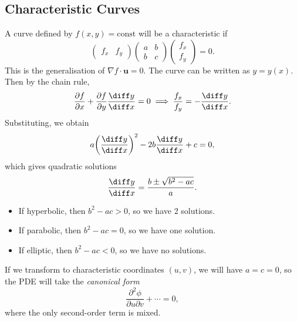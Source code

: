 \documentclass[12pt]{article}
\begin{document}
\subsection{Characteristic Curves}%
\label{sub:characteristic_curves}

A curve defined by $f(x, y) = \text{const}$ will be a characteristic if
\[
\begin{pmatrix}
	f_x & f_y
\end{pmatrix}
\begin{pmatrix}
	a & b \\
	b & c
\end{pmatrix}
\begin{pmatrix}
	f_x \\
	f_y
\end{pmatrix}
= 0
.\]
This is the generalisation of $\nabla f \cdot \mathbf{u} = 0$. The curve can be written as $y = y(x)$. Then by the chain rule,
\[
\frac{\partial f}{\partial x} + \frac{\partial f}{\partial y} \frac{\diff y}{\diff x} = 0 \implies \frac{f_x}{f_y} = - \frac{\diff y}{\diff x}
.\]
Substituting, we obtain
\[
	a \biggl( \frac{\diff y}{\diff x} \biggr)^2 - 2b \frac{\diff y}{\diff x} + c = 0
,\]
which gives quadratic solutions
\[
	\frac{\diff y}{\diff x} = \frac{b \pm \sqrt{b^2 - ac}}{a}
.\]
\begin{itemize}
	\item If hyperbolic, then $b^2 - ac > 0$, so we have 2 solutions.
	\item If parabolic, then $b^2 - ac = 0$, so we have one solution.
	\item If elliptic, then $b^2 - ac < 0$, so we have no solutions.
\end{itemize}

If we transform to characteristic coordinates $(u, v)$, we will have $a = c = 0$, so the PDE will take the \textit{canonical form}
\[
\frac{\partial^2 \phi}{\partial u \partial v} + \cdots = 0
,\]
where the only second-order term is mixed.
\end{document}
